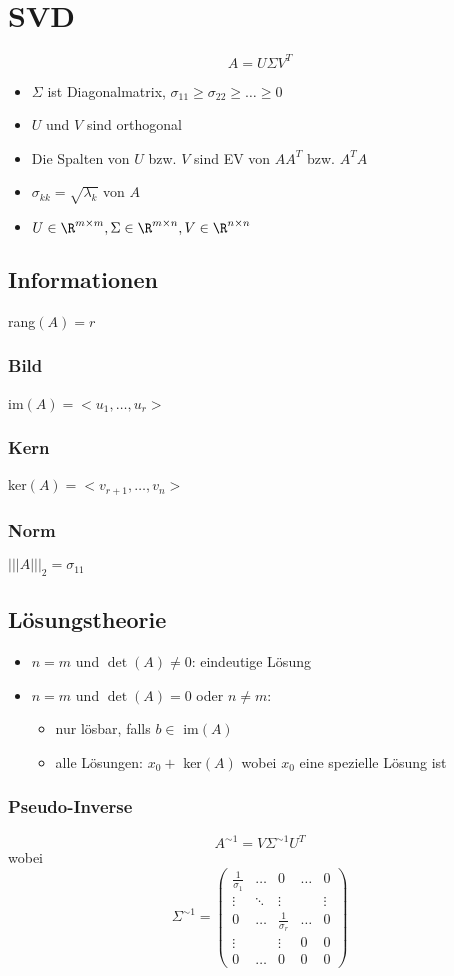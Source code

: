 \section{SVD}
$$
	A = U\Sigma V^T
$$
\begin{itemize}
	\item $\Sigma$ ist Diagonalmatrix, $\sigma_{11}\geq\sigma_{22}\geq\dots\geq 0$
	\item $U$ und $V$ sind orthogonal
	\item Die Spalten von $U$ bzw. $V$ sind EV von $AA^T$ bzw. $A^TA$
	\item $\sigma_{kk} = \sqrt{\lambda_k}$ von $A$
	\item $U\in\R^{m\times m}, \Sigma\in\R^{m\times n}, V\in\R^{n\times n}$
\end{itemize}
\subsection{Informationen}
rang$(A)=r$
\subsubsection{Bild}
im$(A)=<u_1, \dots, u_r>$
\subsubsection{Kern}
ker$(A)=<v_{r+1}, \dots, v_n>$
\subsubsection{Norm}
$|||A|||_2=\sigma_{11}$
\subsection{Lösungstheorie}
\begin{itemize}
	\item $n=m$ und $\det(A) \not = 0$: eindeutige Lösung
	\item $n=m$ und $\det(A) = 0$ oder $n\not = m$:
		\begin{itemize}
			\item nur lösbar, falls $b\in$ im$(A)$
			\item alle Lösungen: $x_0 +$ ker$(A)$ wobei $x_0$ eine spezielle Lösung ist  
		\end{itemize}
\end{itemize}
\subsubsection{Pseudo-Inverse}
$$
	A^{\sim1}=V\Sigma^{\sim1}U^T
$$
wobei
$$
	\Sigma^{\sim1}=\begin{pmatrix}
		\frac{1}{\sigma_1} & \dots & 0 & \dots & 0 \\
		\vdots & \ddots & \vdots & & \vdots \\
		0 & \dots & \frac{1}{\sigma_r} & \dots & 0 \\
		\vdots & &  \vdots & 0 & 0 \\
		0 & \dots & 0 & 0 & 0
	\end{pmatrix}
$$
